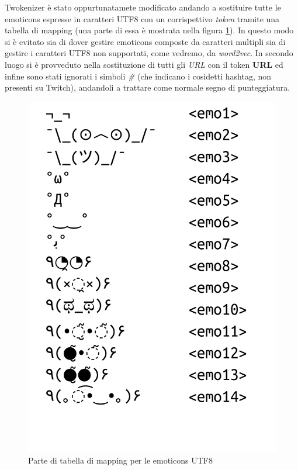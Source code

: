 \documentclass[a4paper,12pt,openright,twoside]{report}
\theoremstyle{definition}
\begin{document}
Twokenizer è stato oppurtunatamete
modificato andando a sostituire tutte le emoticons espresse in caratteri UTF8 con un corrispettivo \emph{token}
tramite una tabella di mapping (una parte di essa è mostrata nella figura \ref{fig:mappingEmo}). In
questo modo si è evitato sia di dover gestire emoticons composte da caratteri multipli sia di gestire
i caratteri UTF8 non supportati, come vedremo, da \emph{word2vec}.
In secondo luogo si è provveduto nella sostituzione di tutti gli \emph{URL} con il token \textbf{URL} ed infine
sono stati ignorati i simboli \emph{\#} (che indicano i cosidetti hashtag, non presenti su Twitch),
andandoli a trattare come normale segno di punteggiatura.

\begin{figure}[ht]
	\centering
	\includegraphics[scale=0.3]{Immagini/emoticonsTable.pdf}
	\caption{Parte di tabella di mapping per le emoticons UTF8}
	\label{fig:mappingEmo}
\end{figure}
\end{document}
